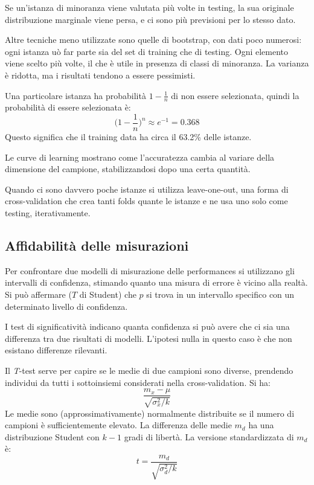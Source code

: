Se un'istanza di minoranza viene valutata più volte in testing, la sua originale distribuzione marginale viene persa, e ci sono più previsioni per lo stesso dato.

Altre tecniche meno utilizzate sono quelle di bootstrap, con dati poco numerosi: ogni istanza uò far parte sia del set di training che di testing. Ogni elemento viene scelto più volte, il che è utile in presenza di classi di minoranza. La varianza è ridotta, ma i risultati tendono a essere pessimisti.

Una particolare istanza ha probabilità $1 - \frac{1}{n}$ di non essere selezionata, quindi la probabilità di essere selezionata è:
$$\Big(1 - \frac{1}{n}\Big)^n \approx e^{-1} = 0.368$$
Questo significa che il training data ha circa il 63.2\% delle istanze.

Le curve di learning mostrano come l'accuratezza cambia al variare della dimensione del campione, stabilizzandosi dopo una certa quantità. 

Quando ci sono davvero poche istanze si utilizza leave-one-out, una forma di cross-validation che crea tanti folds quante le istanze e ne usa uno solo come testing, iterativamente.

\subsection{Affidabilità delle misurazioni}
Per confrontare due modelli di misurazione delle performances si utilizzano gli intervalli di confidenza, stimando quanto una misura di errore è vicino alla realtà. Si può affermare ($T$ di Student) che $p$ si trova in un intervallo specifico con un determinato livello di confidenza.

I test di significatività indicano quanta confidenza si può avere che ci sia una differenza tra due risultati di modelli. L'ipotesi nulla in questo caso è che non esistano differenze rilevanti.

Il \textit{T}-test serve per capire se le medie di due campioni sono diverse, prendendo individui da tutti i sottoinsiemi considerati nella cross-validation. Si ha:
$$\frac{m_x- \mu}{\sqrt{\sigma^2_x / k}}$$
Le medie sono (approssimativamente) normalmente distribuite se il numero di campioni è sufficientemente elevato. La differenza delle medie $m_d$ ha una distribuzione Student con $k - 1$ gradi di libertà. La versione standardizzata di $m_d$ è:
$$t = \frac{m_d}{\sqrt{\sigma^2_d / k}}$$





